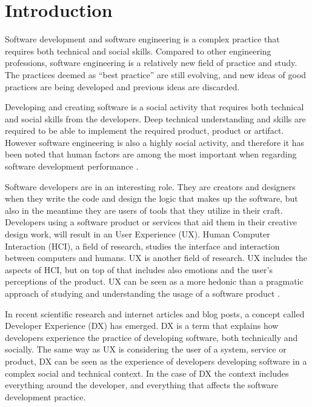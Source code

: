 \documentclass[english, 12pt, a4paper, sci, utf8, a-1b, online]{aaltothesis}
\begin{document}
\cleardoublepage
\section{Introduction} \label{section:introduction}

Software development and software engineering is a complex practice that requires both technical and social skills. Compared to other engineering professions, software engineering is a relatively new field of practice and study. The practices deemed as ``best practice'' are still evolving, and new ideas of good practices are being developed and previous ideas are discarded.

Developing and creating software is a social activity that requires both technical and social skills from the developers. Deep technical understanding and skills are required to be able to implement the required product, product or artifact. However software engineering is also a highly social activity, and therefore it has been noted that human factors are among the most important when regarding software development performance \parencite{peopleware}.

Software developers are in an interesting role. They are creators and designers when they write the code and design the logic that makes up the software, but also in the meantime they are users of tools that they utilize in their craft. Developers using a software product or services that aid them in their creative design work, will result in an User Experience (UX). Human Computer Interaction (HCI), a field of research, studies the interface and interaction between computers and humans. UX is another field of research. UX includes the aspects of HCI, but on top of that includes also emotions and the user's perceptions of the product. UX can be seen as a more hedonic than a pragmatic approach of studying and understanding the usage of a software product \parencite{the-thing-and-i}.

In recent scientific research and internet articles and blog posts, a concept called Developer Experience (DX) has emerged. DX is a term that explains how developers experience the practice of developing software, both technically and socially. The same way as UX is considering the user of a system, service or product, DX can be seen as the experience of developers developing software in a complex social and technical context. In the case of DX the context includes everything around the developer, and everything that affects the software development practice.
\end{document}

